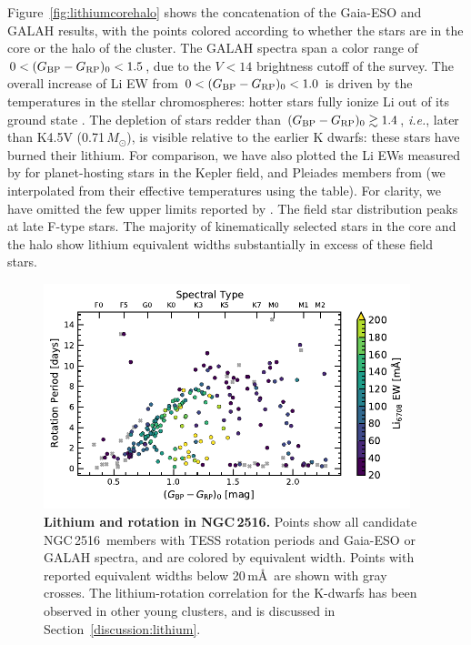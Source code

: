 \documentclass[12pt,twocolumn,tighten]{aastex63}
\newcommand{\cn}{NGC\,2516} %
\newcommand{\bpmrpo}{(G_{\rm BP}-G_{\rm RP})_0}
\begin{document}
Figure~\ref{fig:lithiumcorehalo} shows the concatenation of the
Gaia-ESO and GALAH results, with the points colored according to
whether the stars are in the core or the halo of the cluster.  The
GALAH spectra span a color range of $0<\bpmrpo<1.5$, due to the $V<14$
brightness cutoff of the survey.  The overall increase of Li EW from
$0<\bpmrpo<1.0$ is driven by the temperatures in the stellar
chromospheres: hotter stars fully ionize Li out of its ground state
\citep[{\it e.g.}, Figure~4 of][]{soderblom_evolution_1993}.  The
depletion of stars redder than $\bpmrpo\gtrsim1.4$, {\it i.e.}, later
than K4.5V (0.71\,$M_\odot$), is visible relative to the earlier K
dwarfs: these stars have burned their lithium.  For comparison, we
have also plotted the Li EWs measured by
\citet{berger_identifying_2018} for planet-hosting stars in the Kepler
field, and Pleiades members from \citet{bouvier_pleiades_lirot_2018}
(we interpolated from their effective temperatures using the
\citealt{pecaut_mamajek_2013} table).  For clarity, we have omitted the
few upper limits reported by \citet{bouvier_pleiades_lirot_2018}.  The
field star distribution peaks at late F-type stars.  The majority of
kinematically selected stars in the core and the halo show lithium
equivalent widths substantially in excess of these field stars.

\begin{figure}[t]
	\begin{center}
		\leavevmode
		\includegraphics[width=0.95\textwidth]{f8.pdf}
	\end{center}
	\vspace{-0.7cm}
	\caption{ {\bf Lithium and rotation in NGC\,2516.} Points show all
		candidate \cn\ members with TESS rotation periods and Gaia-ESO or
		GALAH spectra, and are colored by equivalent width.  Points with
		reported equivalent widths below 20\,m\AA\ are shown with gray
		crosses.  The lithium-rotation correlation for the K-dwarfs has been
		observed in other young clusters, and is discussed in
		Section~\ref{discussion:lithium}.
		\label{fig:lithiumrot}
	}
\end{figure}
\end{document}
